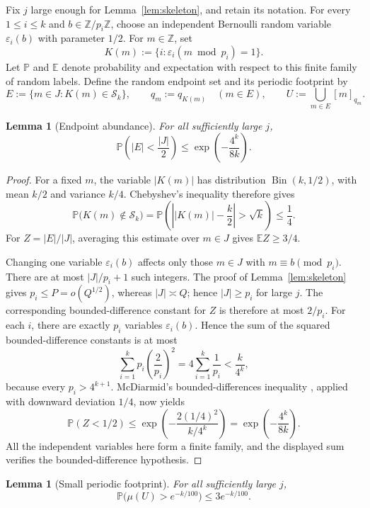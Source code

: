 \documentclass[11pt]{article}
\numberwithin{equation}{section}
\newtheorem{lemma}[theorem]{Lemma}
\theoremstyle{definition}
\theoremstyle{remark}
\newcommand{\Z}{\mathbb Z}
\newcommand{\Pp}{\mathbb P}
\newcommand{\E}{\mathbb E}
\newcommand{\cS}{\mathcal S}
\begin{document}
Fix \(j\) large enough for Lemma~\ref{lem:skeleton}, and retain its
notation.  For every \(1\le i\le k\) and
\(b\in\Z/p_i\Z\), choose an independent Bernoulli random variable
\(\varepsilon_i(b)\) with parameter \(1/2\).  For \(m\in\Z\), set
\[
 K(m):=\{i:\varepsilon_i(m\bmod p_i)=1\}.
\]
Let \(\Pp\) and \(\E\) denote probability and expectation with respect to
this finite family of random labels.
Define the random endpoint set and its periodic footprint by
\[
 E:=\{m\in J:K(m)\in\cS_k\},\qquad
 q_m:=q_{K(m)}\quad(m\in E),\qquad
 U:=\bigcup_{m\in E}[m]_{q_m}.
\]

\begin{lemma}[Endpoint abundance]\label{lem:endpoints}
For all sufficiently large \(j\),
\[
 \Pp\left(|E|<\frac{|J|}{2}\right)
 \le \exp\left(-\frac{4^k}{8k}\right).
\]
\end{lemma}

\begin{proof}
For a fixed \(m\), the variable \(|K(m)|\) has distribution
\(\operatorname{Bin}(k,1/2)\), with mean \(k/2\) and variance \(k/4\).
Chebyshev's inequality therefore gives
\[
 \Pp\bigl(K(m)\notin\cS_k\bigr)
 =\Pp\left(\left||K(m)|-\frac k2\right|>\sqrt k\right)
 \le\frac14.
\]
For \(Z=|E|/|J|\), averaging this estimate over \(m\in J\) gives
\(\E Z\ge3/4\).

Changing one variable \(\varepsilon_i(b)\) affects only those \(m\in J\)
with \(m\equiv b\pmod {p_i}\).  There are at most
\(|J|/p_i+1\) such integers.  The proof of Lemma~\ref{lem:skeleton} gives
\(p_i\le P=o(Q^{1/2})\), whereas \(|J|\asymp Q\); hence
\(|J|\ge p_i\) for large \(j\).  The corresponding bounded-difference
constant for \(Z\) is therefore at most \(2/p_i\).  For each \(i\), there
are exactly \(p_i\) variables \(\varepsilon_i(b)\).  Hence the sum of the
squared bounded-difference constants is at most
\[
 \sum_{i=1}^k p_i\left(\frac2{p_i}\right)^2
 =4\sum_{i=1}^k\frac1{p_i}
 <\frac{k}{4^k},
\]
because every \(p_i>4^{k+1}\).  McDiarmid's bounded-differences inequality
\cite{McDiarmid89}, applied with downward deviation \(1/4\), now yields
\[
 \Pp(Z<1/2)
 \le \exp\left(
       -\frac{2(1/4)^2}{\,k/4^k\,}\right)
 =\exp\left(-\frac{4^k}{8k}\right).
\]
All the independent variables here form a finite family, and the displayed
sum verifies the bounded-difference hypothesis.
\end{proof}

\begin{lemma}[Small periodic footprint]\label{lem:footprint}
For all sufficiently large \(j\),
\[
 \Pp\bigl(\mu(U)>e^{-k/100}\bigr)\le3e^{-k/100}.
\]
\end{lemma}
\end{document}
